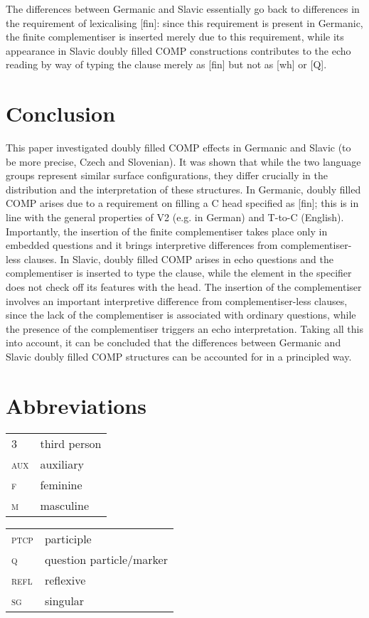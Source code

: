 \documentclass[output=paper,
modfonts, hidelinks, newtxmath
]{langscibook}
\begin{document}
The differences between Germanic and Slavic essentially go back to differences in the requirement of lexicalising [fin]: since this requirement is present in Germanic, the finite complementiser is inserted merely due to this requirement, while its appearance in Slavic doubly filled COMP constructions contributes to the echo reading by way of typing the clause merely as [fin] but not as [wh] or [Q].

\section{Conclusion}
This paper investigated doubly filled COMP effects in Germanic and Slavic (to be more precise, Czech and Slovenian). It was shown that while the two language groups represent similar surface configurations, they differ crucially in the distribution and the interpretation of these structures. In Germanic, doubly filled COMP arises due to a requirement on filling a C head specified as [fin]; this is in line with the general properties of V2 (e.g. in German) and T-to-C (English). Importantly, the insertion of the finite complementiser takes place only in embedded questions and it brings interpretive differences from complementiser-less clauses. In Slavic, doubly filled COMP arises in echo questions and the complementiser is inserted to type the clause, while the element in the specifier does not check off its features with the head. The insertion of the complementiser involves an important interpretive difference from complementiser-less clauses, since the lack of the complementiser is associated with ordinary questions, while the presence of the complementiser triggers an echo interpretation. Taking all this into account, it can be concluded that the differences between Germanic and Slavic doubly filled COMP structures can be accounted for in a principled way.

\section*{Abbreviations}

\begin{tabularx}{.5\textwidth}{@{}lQ@{}}
3&third person\\
\textsc{aux}&auxiliary\\
\textsc{f}&feminine\\
\textsc{m}&masculine\\
\end{tabularx}%
\begin{tabularx}{.5\textwidth}{@{}lQ@{}}
\textsc{ptcp}&participle\\
\textsc{q}&question particle/marker\\
\textsc{refl}&reflexive\\
\textsc{sg}&singular\\
\end{tabularx}
\end{document}
